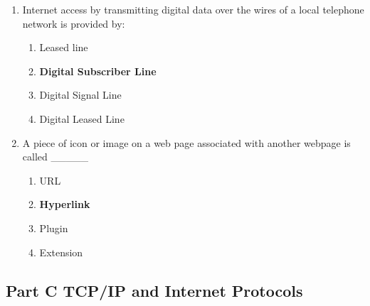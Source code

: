 \documentclass{article}
\begin{document}
\begin{enumerate}[label=\arabic*.]
    \item Internet access by transmitting digital data over the wires of a local telephone network is provided by:
          \begin{enumerate}
              \item Leased line
              \item \textbf{Digital Subscriber Line}
              \item Digital Signal Line
              \item Digital Leased Line
          \end{enumerate}

    \item A piece of icon or image on a web page associated with another webpage is called \_\_\_\_\_
          \begin{enumerate}
              \item URL
              \item \textbf{Hyperlink}
              \item Plugin
              \item Extension
          \end{enumerate}

\end{enumerate}

\subsection*{Part C\: TCP/IP and Internet Protocols}
\end{document}

